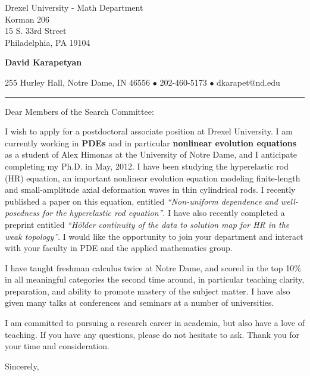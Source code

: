 \documentclass[12pt]{letter}
\date{\vspace{0.5cm}\flushleft \today}
\begin{document}
\begin{letter}{Drexel University - Math Department \\
Korman 206 \\
15 S. 33rd Street \\
Philadelphia, PA 19104}
\begin{center}
{\bf {\Large David Karapetyan}}
\end{center}

\begin{center}
{255 Hurley Hall, Notre Dame, IN 46556  $\bullet$
202-460-5173 $\bullet$ dkarapet@nd.edu
}
\end{center}
\hrule

\opening{Dear Members of the Search Committee:\\}
%
%
I wish to apply for a postdoctoral associate position at
Drexel University. I am currently working in \textbf{PDEs} and in particular \textbf{nonlinear evolution equations} as a student of Alex Himonas at the
University of Notre Dame, and I anticipate completing my Ph.D.
in May, 2012. I have been studying the hyperelastic rod (HR) equation, an important nonlinear
evolution equation modeling finite-length and small-amplitude axial deformation
waves in thin cylindrical rods. I recently published a paper on this equation,
entitled {\it ``Non-uniform dependence and well-posedness for the hyperelastic
rod equation''}. I have also recently completed a preprint entitled {\it
  ``H\"older continuity of the data to solution map for HR in the weak
topology''}. I would like the opportunity to join your department and interact
with your faculty in PDE and the applied mathematics group. 

I have taught freshman calculus twice at Notre Dame, and scored in the top 10\%
in all meaningful categories the second time around, in particular teaching
clarity, preparation, and ability to promote mastery of the subject matter. I
have also given many talks at conferences and seminars at a number of
universities. 

I am committed to pursuing a research career in academia, but also have a love
of teaching. If you have any questions, please do not hesitate to ask. Thank you for your time and consideration. 

\closing{Sincerely,}


\end{letter}
\end{document}
